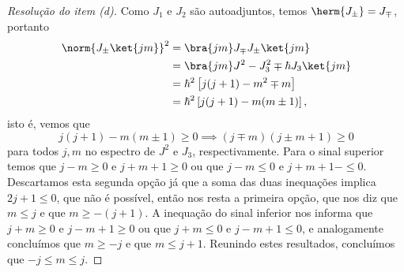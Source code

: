 \begin{proof}[Resolução do item (d)]
    Como \(J_1\) e \(J_2\) são autoadjuntos, temos \(\herm{J_\pm} = J_\mp\), portanto
    \begin{align*}
        \norm{J_\pm \ket{jm}}^2 &= \bra{jm}J_\mp J_\pm\ket{jm}\\
                                &= \bra{jm}J^2 - J_3^2 \mp \hbar J_3 \ket{jm}\\
                                &= \hbar^2\left[j(j+1) - m^2 \mp m\right]\\
                                &= \hbar^2 \left[j(j+1) - m(m \pm 1)\right],
    \end{align*}
    isto é, vemos que
    \begin{equation*}
        j(j + 1) - m(m \pm 1) \geq 0 \implies (j \mp m)(j \pm m + 1) \geq 0
    \end{equation*}
    para todos \(j,m\) no espectro de \(J^2\) e \(J_3\), respectivamente. Para o sinal superior temos que \(j - m \geq 0\) e \(j + m + 1 \geq 0\) ou que \(j - m \leq 0\) e \(j + m + 1 - \leq 0\). Descartamos esta segunda opção já que a soma das duas inequações implica \(2j + 1 \leq 0\), que não é possível, então nos resta a primeira opção, que nos diz que \(m \leq j\) e que \(m \geq -(j+1)\). A inequação do sinal inferior nos informa que \(j + m \geq 0\) e \(j - m + 1 \geq 0\) ou que \(j + m \leq 0\) e \(j - m + 1 \leq 0\), e analogamente concluímos que \(m \geq -j\) e que \(m \leq j+1\). Reunindo estes resultados, concluímos que \(-j \leq m \leq j\).


\end{proof}
